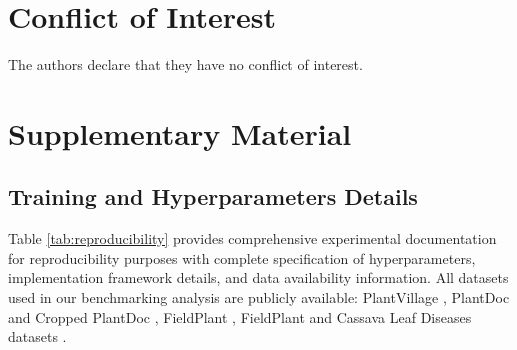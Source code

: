 \documentclass[sn-mathphys]{sn-jnl}
\theoremstyle{thmstyleone}%
\theoremstyle{thmstyletwo}%
\theoremstyle{thmstylethree}%
\begin{document}
\section*{Conflict of Interest}
The authors declare that they have no conflict of interest.
%


\newpage
\section*{Supplementary Material}
\subsection*{Training and Hyperparameters Details}
Table \ref{tab:reproducibility} provides comprehensive experimental documentation for reproducibility purposes with complete specification of hyperparameters, implementation framework details, and data availability information. All datasets used in our benchmarking analysis are publicly available: PlantVillage \citep{mohanty2016using}, PlantDoc and Cropped PlantDoc \citep{singh2020plantdoc}, FieldPlant \citep{singh2019plant}, FieldPlant \citep{moupojou2023fieldplant}and Cassava Leaf Diseases datasets \citep{Cassava_Competition}.
\end{document}
